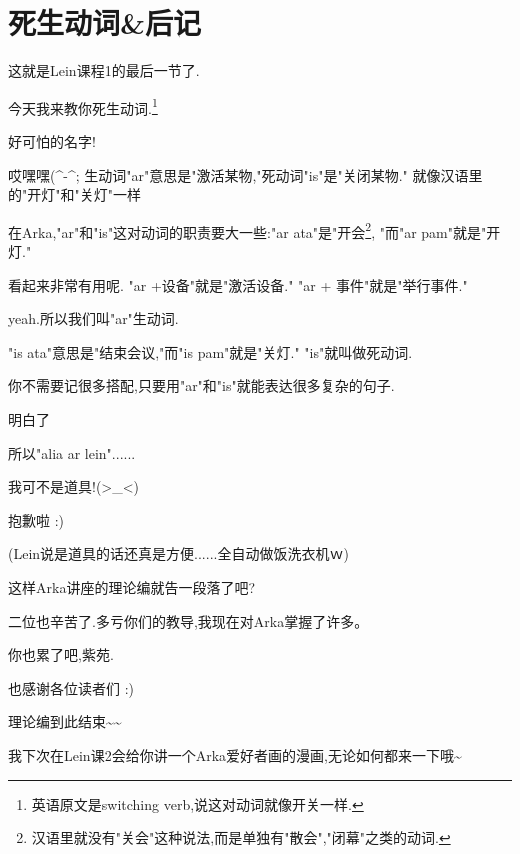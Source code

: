 \chapter{死生动词\&后记}
这就是Lein课程1的最后一节了.

今天我来教你死生动词.\footnote{英语原文是switching verb,说这对动词就像开关一样.}


好可怕的名字!


哎嘿嘿(\^{}-\^{};
生动词"ar"意思是"激活某物,"死动词"is"是"关闭某物."
就像汉语里的"开灯"和"关灯"一样

在Arka,"ar"和"is"这对动词的职责要大一些:"ar ata"是"开会\footnote{汉语里就没有"关会"这种说法,而是单独有"散会","闭幕"之类的动词.},
"而"ar pam"就是"开灯."


看起来非常有用呢.
"ar +设备"就是"激活设备." "ar + 事件"就是"举行事件."

yeah.所以我们叫"ar"生动词.

"is ata"意思是"结束会议,"而"is pam"就是"关灯." "is"就叫做死动词.

你不需要记很多搭配,只要用"ar"和"is"就能表达很多复杂的句子.


明白了

所以"alia ar lein"......


我可不是道具!(>\_{}<)


抱歉啦 :)


(Lein说是道具的话还真是方便......全自动做饭洗衣机ｗ)

    
这样Arka讲座的理论编就告一段落了吧?

二位也辛苦了.多亏你们的教导,我现在对Arka掌握了许多。



你也累了吧,紫苑.

也感谢各位读者们 :)

理论编到此结束\~{}\~{}

我下次在Lein课2会给你讲一个Arka爱好者画的漫画,无论如何都来一下哦\~{}